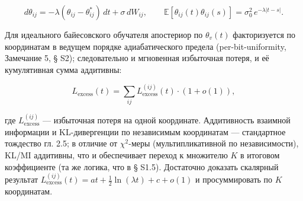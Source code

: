 \documentclass[12pt]{iopart}
\begin{document}
\[d\theta_{ij} = -\lambda(\theta_{ij}-\theta_{ij}^*)\,dt + \sigma\,dW_{ij}, \qquad \mathbb{E}[\theta_{ij}(t)\theta_{ij}(s)] = \sigma_0^2\,e^{-\lambda|t-s|}.\]



Для идеального байесовского обучателя апостериор по \(\theta_v(t)\) факторизуется по координатам в ведущем порядке адиабатического предела (per-bit-uniformity, \cite{Andriishin2026b} Замечание 5, § S2); следовательно и мгновенная избыточная потеря, и её кумулятивная сумма аддитивны:



\begin{equation}L_{\text{excess}}(t) = \sum_{ij} L_{\text{excess}}^{(ij)}(t) \cdot (1 + o(1)), \tag{S1.1}\end{equation}



где \(L_{\text{excess}}^{(ij)}\) --- избыточная потеря на одной координате. Аддитивность взаимной информации и KL-дивергенции по независимым координатам --- стандартное тождество \cite{CoverThomas2006} гл. 2.5; в отличие от \(\chi^2\)-меры (мультипликативной по независимости), KL/MI аддитивны, что и обеспечивает переход к множителю \(K\) в итоговом коэффициенте (та же логика, что в \cite{Andriishin2026b} § S1.5). Достаточно доказать скалярный результат \(L_{\text{excess}}^{(ij)}(t) = a t + \tfrac12\ln(\lambda t) + c + o(1)\) и просуммировать по \(K\) координатам.
\end{document}
